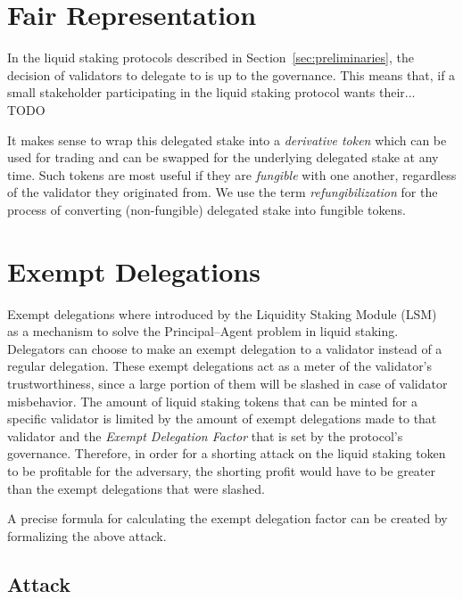 \section{Fair Representation}

In the liquid staking protocols described in Section~\ref{sec:preliminaries},
the decision of validators to delegate to is up to the governance.
This means that, if a small stakeholder
participating in the liquid staking protocol wants their... TODO

\cite{mill1862true}

It makes sense to wrap this delegated
stake into a \emph{derivative token} which can be used for trading and can
be swapped for the underlying delegated stake at any time. Such tokens
are most useful if they are \emph{fungible} with one another, regardless
of the validator they originated from. We use the term
\emph{refungibilization} for the process of converting (non-fungible) delegated stake
into fungible tokens.

\section{Exempt Delegations}

Exempt delegations where introduced by the Liquidity Staking Module
(LSM)~\cite{liquidity-staking-module} as a mechanism to solve the Principal--Agent problem in liquid
staking.
Delegators can choose to make an exempt delegation to a
validator instead of a regular delegation.
These exempt delegations act as a meter of the
validator's trustworthiness, since a large portion of them
will be slashed in case of validator misbehavior.
The amount of liquid staking tokens that can be
minted for a specific validator is limited by the amount of
exempt delegations made to that validator and the \emph{Exempt Delegation Factor}
that is set by the protocol's governance.
Therefore, in order for a shorting attack on the liquid staking
token to be profitable for the adversary, the shorting profit would
have to be greater than the exempt delegations that were slashed.

A precise formula for calculating the exempt delegation factor can be
created by formalizing the above attack.

\subsection{Attack}

